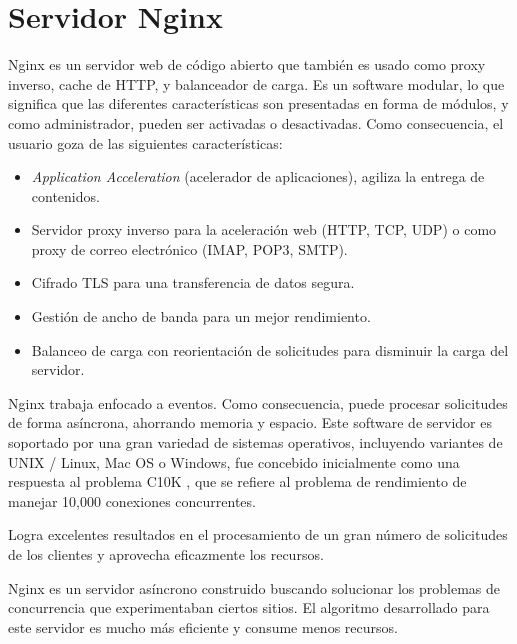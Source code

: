 \section{Servidor Nginx}


Nginx \citep{WEBSITE:32} es un servidor web de código abierto que también es usado como proxy inverso, cache de HTTP, y balanceador de carga.  Es un software modular, lo que significa que las diferentes características son presentadas en forma de módulos, y como administrador, pueden ser activadas o desactivadas. Como consecuencia, el usuario goza de las siguientes características:

\begin{itemize}
	\item \textit{Application Acceleration} (acelerador de aplicaciones), agiliza la entrega de contenidos.
	
	\item Servidor proxy inverso para la aceleración web (HTTP, TCP, UDP) o como proxy de correo electrónico (IMAP, POP3, SMTP).
	
	\item Cifrado TLS para una transferencia de datos segura.
	
	\item Gestión de ancho de banda para un mejor rendimiento.
	
	\item Balanceo de carga con reorientación de solicitudes para disminuir la carga del servidor.
	
\end{itemize}


Nginx trabaja enfocado a eventos. Como consecuencia, puede procesar solicitudes de forma asíncrona, ahorrando memoria y espacio. Este software de servidor es soportado por una gran variedad de sistemas operativos, incluyendo variantes de UNIX / Linux, Mac OS o Windows, fue concebido inicialmente como una respuesta al problema C10K \citep{WEBSITE:33}, que se refiere al problema de rendimiento de manejar 10,000 conexiones concurrentes.

Logra excelentes resultados en el procesamiento de un gran número de solicitudes de los clientes y aprovecha eficazmente los recursos.

Nginx es un servidor asíncrono construido buscando solucionar los problemas de concurrencia que experimentaban ciertos sitios. El algoritmo desarrollado para este servidor es mucho más eficiente y consume menos recursos.

